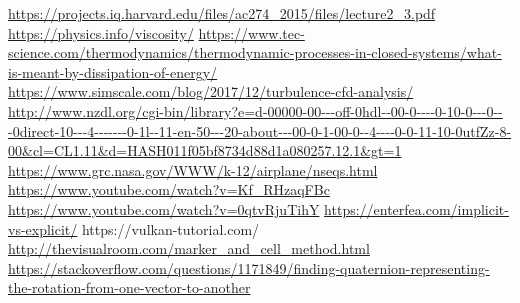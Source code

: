 \documentclass{article}
\begin{document}
\begin{thebibliography}{3}
\url{https://projects.iq.harvard.edu/files/ac274_2015/files/lecture2_3.pdf}
\url{https://physics.info/viscosity/}
\url{https://www.tec-science.com/thermodynamics/thermodynamic-processes-in-closed-systems/what-is-meant-by-dissipation-of-energy/}
\url{https://www.simscale.com/blog/2017/12/turbulence-cfd-analysis/}
\url{http://www.nzdl.org/cgi-bin/library?e=d-00000-00---off-0hdl--00-0----0-10-0---0---0direct-10---4-------0-1l--11-en-50---20-about---00-0-1-00-0--4----0-0-11-10-0utfZz-8-00\&cl=CL1.11\&d=HASH011f05bf8734d88d1a080257.12.1\&gt=1}
\url{https://www.grc.nasa.gov/WWW/k-12/airplane/nseqs.html}
\url{https://www.youtube.com/watch?v=Kf_RHzaqFBc}
\url{https://www.youtube.com/watch?v=0qtvRjuTihY}
\url{https://enterfea.com/implicit-vs-explicit/}
https://vulkan-tutorial.com/
\url{http://thevisualroom.com/marker_and_cell_method.html}
\url{https://stackoverflow.com/questions/1171849/finding-quaternion-representing-the-rotation-from-one-vector-to-another}
\end{thebibliography}
\end{document}
